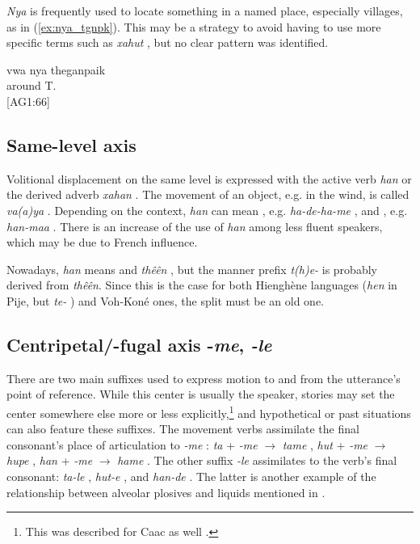 \textit{Nya} is frequently used to locate something in a named place, especially villages, as in (\ref{ex:nya_tgnpk}). This may be a strategy to avoid having to use more specific terms such as \textit{xahut} , but no clear pattern was identified.

\ea \label{ex:nya_tgnpk}\gll vwa nya theganpaik\\
  around T.\\
\glt {} {[AG1:66]}
\z

\subsection{Same-level axis}
Volitional displacement on the same level is expressed with the active verb \textit{han} or the derived adverb \textit{xahan} . The movement of an object, e.g. in the wind, is called \textit{va(a)ya} . Depending on the context, \textit{han} can mean , e.g. \textit{ha-de-ha-me}  , and , e.g. \textit{han-maa} . There is an increase of the use of \textit{han} among less fluent speakers, which may be due to French influence. 

Nowadays, \textit{han} means  and \textit{thêên} , but the manner prefix \textit{t(h)e-}  is probably derived from \textit{thêên}. Since this is the case for both Hienghène languages (\textit{hen}  in Pije, but \textit{te-} ) and Voh-Koné ones, the split must be an old one.


\subsection{Centripetal/-fugal axis -\textit{me}, \textit{-le}}
\largerpage
There are two main suffixes used to express motion to and from the utterance's point of reference. While this center is usually the speaker, stories may set the center somewhere else more or less explicitly,\footnote{This was described for Caac as well \parencite[176]{cauchard_study_2014}.} and hypothetical or past situations can also feature these suffixes.
The movement verbs assimilate the final consonant's place of articulation to \textit{-me} : \textit{ta} + \textit{-me} $\rightarrow$ \textit{tame} , \textit{hut}  + \textit{-me} $\rightarrow$ \textit{hupe} , \textit{han}  + \textit{-me} $\rightarrow$ \textit{hame} . The other suffix \textit{-le}  assimilates to the verb's final consonant: \textit{ta-le} , \textit{hut-e} , and \textit{han-de} . The latter is another example of the relationship between alveolar plosives and liquids mentioned in .

